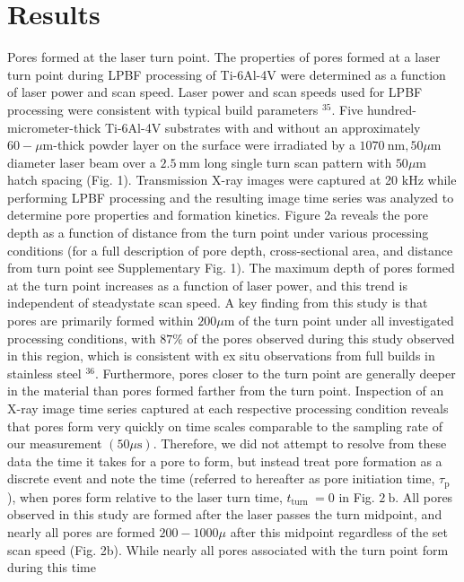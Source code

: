 \documentclass[10pt]{article}
\begin{document}
\section*{Results}
Pores formed at the laser turn point. The properties of pores formed at a laser turn point during LPBF processing of Ti-6Al-4V were determined as a function of laser power and scan speed. Laser power and scan speeds used for LPBF processing were consistent with typical build parameters ${ }^{35}$. Five hundred-micrometer-thick Ti-6Al-4V substrates with and without an approximately $60-\mu \mathrm{m}$-thick powder layer on the surface were irradiated by a $1070 \mathrm{~nm}, 50 \mu \mathrm{m}$ diameter laser beam over a $2.5 \mathrm{~mm}$ long single turn scan pattern with $50 \mu \mathrm{m}$ hatch spacing (Fig. 1). Transmission X-ray images were captured at 20 $\mathrm{kHz}$ while performing LPBF processing and the resulting image time series was analyzed to determine pore properties and formation kinetics. Figure 2a reveals the pore depth as a function of distance from the turn point under various processing conditions (for a full description of pore depth, cross-sectional area, and distance from turn point see Supplementary Fig. 1). The maximum depth of pores formed at the turn point increases as a function of laser power, and this trend is independent of steadystate scan speed. A key finding from this study is that pores are primarily formed within $200 \mu \mathrm{m}$ of the turn point under all investigated processing conditions, with $87 \%$ of the pores observed during this study observed in this region, which is consistent with ex situ observations from full builds in stainless steel ${ }^{36}$. Furthermore, pores closer to the turn point are generally deeper in the material than pores formed farther from the turn point. Inspection of an X-ray image time series captured at each respective processing condition reveals that pores form very quickly on time scales comparable to the sampling rate of our measurement $(50 \mu \mathrm{s})$. Therefore, we did not attempt to resolve from these data the time it takes for a pore to form, but instead treat pore formation as a discrete event and note the time (referred to hereafter as pore initiation time, $\tau_{\mathrm{p}}$ ), when pores form relative to the laser turn time, $t_{\text {turn }}=0$ in Fig. $2 \mathrm{~b}$. All pores observed in this study are formed after the laser passes the turn midpoint, and nearly all pores are formed $200-1000 \mu$ after this midpoint regardless of the set scan speed (Fig. 2b). While nearly all pores associated with the turn point form during this time
\end{document}
